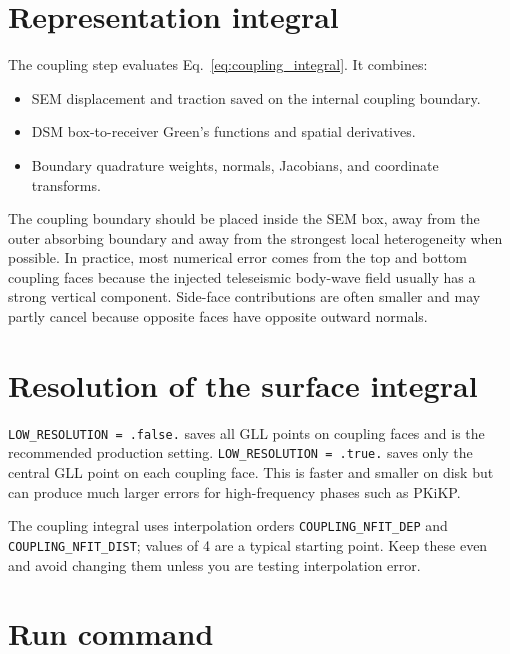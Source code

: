 \documentclass[11pt,oneside]{book}
\DeclareRobustCommand{\code}[1]{\nolinkurl{#1}}
\begin{document}
\section{Representation integral}

The coupling step evaluates Eq.~\ref{eq:coupling_integral}. It combines:
\begin{itemize}
  \item SEM displacement and traction saved on the internal coupling boundary.
  \item DSM box-to-receiver Green's functions and spatial derivatives.
  \item Boundary quadrature weights, normals, Jacobians, and coordinate
  transforms.
\end{itemize}

The coupling boundary should be placed inside the SEM box, away from the outer
absorbing boundary and away from the strongest local heterogeneity when
possible. In practice, most numerical error comes from the top and bottom
coupling faces because the injected teleseismic body-wave field usually has a
strong vertical component. Side-face contributions are often smaller and may
partly cancel because opposite faces have opposite outward normals.

\section{Resolution of the surface integral}

\code{LOW_RESOLUTION = .false.} saves all GLL points on coupling faces and is
the recommended production setting. \code{LOW_RESOLUTION = .true.} saves only
the central GLL point on each coupling face. This is faster and smaller on
disk but can produce much larger errors for high-frequency phases such as
PKiKP.

The coupling integral uses interpolation orders
\code{COUPLING_NFIT_DEP} and \code{COUPLING_NFIT_DIST}; values of 4 are a
typical starting point. Keep these even and avoid changing them unless you are
testing interpolation error.

\section{Run command}
\end{document}

